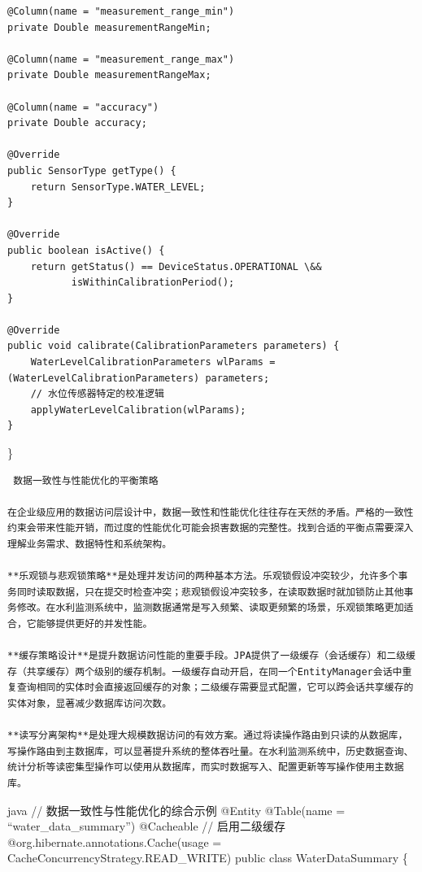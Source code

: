 \begin{verbatim}
@Column(name = "measurement_range_min")
private Double measurementRangeMin;

@Column(name = "measurement_range_max") 
private Double measurementRangeMax;

@Column(name = "accuracy")
private Double accuracy;

@Override
public SensorType getType() {
    return SensorType.WATER_LEVEL;
}

@Override
public boolean isActive() {
    return getStatus() == DeviceStatus.OPERATIONAL \&& 
           isWithinCalibrationPeriod();
}

@Override
public void calibrate(CalibrationParameters parameters) {
    WaterLevelCalibrationParameters wlParams = (WaterLevelCalibrationParameters) parameters;
    // 水位传感器特定的校准逻辑
    applyWaterLevelCalibration(wlParams);
}
\end{verbatim}

\}

\begin{lstlisting}
 数据一致性与性能优化的平衡策略

在企业级应用的数据访问层设计中，数据一致性和性能优化往往存在天然的矛盾。严格的一致性约束会带来性能开销，而过度的性能优化可能会损害数据的完整性。找到合适的平衡点需要深入理解业务需求、数据特性和系统架构。

**乐观锁与悲观锁策略**是处理并发访问的两种基本方法。乐观锁假设冲突较少，允许多个事务同时读取数据，只在提交时检查冲突；悲观锁假设冲突较多，在读取数据时就加锁防止其他事务修改。在水利监测系统中，监测数据通常是写入频繁、读取更频繁的场景，乐观锁策略更加适合，它能够提供更好的并发性能。

**缓存策略设计**是提升数据访问性能的重要手段。JPA提供了一级缓存（会话缓存）和二级缓存（共享缓存）两个级别的缓存机制。一级缓存自动开启，在同一个EntityManager会话中重复查询相同的实体时会直接返回缓存的对象；二级缓存需要显式配置，它可以跨会话共享缓存的实体对象，显著减少数据库访问次数。

**读写分离架构**是处理大规模数据访问的有效方案。通过将读操作路由到只读的从数据库，写操作路由到主数据库，可以显著提升系统的整体吞吐量。在水利监测系统中，历史数据查询、统计分析等读密集型操作可以使用从数据库，而实时数据写入、配置更新等写操作使用主数据库。
\end{lstlisting}

java // 数据一致性与性能优化的综合示例 @Entity @Table(name = ``water\_data\_summary'') @Cacheable // 启用二级缓存 @org.hibernate.annotations.Cache(usage = CacheConcurrencyStrategy.READ\_WRITE) public class WaterDataSummary \{

